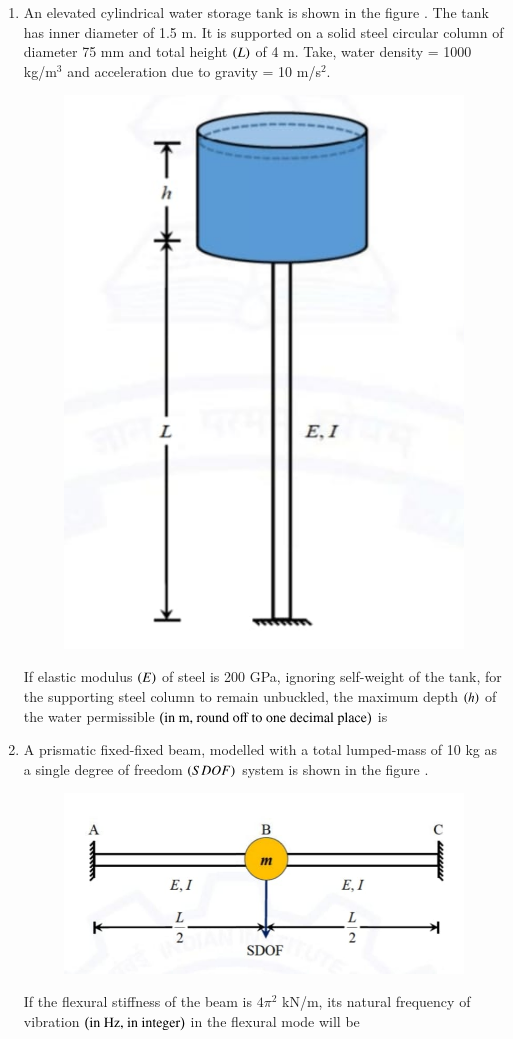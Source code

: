 \documentclass[journal,12pt,onecolumn]{article}
\theoremstyle{remark}
\begin{document}
\begin{enumerate}
\item An elevated cylindrical water storage tank is shown in the figure . The tank has inner diameter of 1.5 m. It is supported on a solid steel circular column of diameter 75 mm and total height $\left(L\right)$ of 4 m. Take, water density = 1000 kg/m$^3$ and acceleration due to gravity = 10 m/s$^2$.
\begin{figure}[H]
    \centering
    \includegraphics[width=0.7\columnwidth]{figs/2q37.jpg}
    \caption{}
    \label{fig:q37}
\end{figure}
If elastic modulus $\left(E\right)$ of steel is 200 GPa, ignoring self-weight of the tank, for the supporting steel column to remain unbuckled, the maximum depth $\left(h\right)$ of the water permissible $\left(\text{in m, round off to one decimal place}\right)$ is \underline{\hspace{2cm}}

\hfill{}

\item A prismatic fixed-fixed beam, modelled with a total lumped-mass of 10 kg as a single degree of freedom $\left(SDOF\right)$ system is shown in the figure .
\begin{figure}[H]
    \centering
    \includegraphics[width=0.7\columnwidth]{figs/2q38.jpg}
    \caption{}
    \label{fig:q38}
\end{figure}
If the flexural stiffness of the beam is $4\pi^2$ kN/m, its natural frequency of vibration $\left(\text{in Hz, in integer}\right)$ in the flexural mode will be \underline{\hspace{2cm}}


\end{enumerate}
\end{document}
